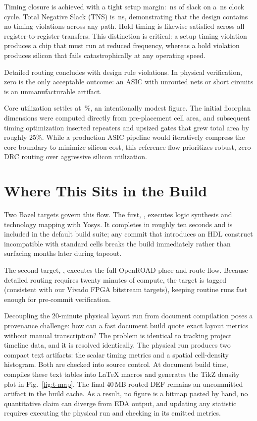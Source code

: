 \documentclass[journal,9pt]{IEEEtran}
\begin{document}
Timing closure is achieved with a tight setup margin: \asicslack\,ns of
slack on a \asicperiod\,ns clock cycle. Total Negative Slack (TNS) is
\asictns\,ns, demonstrating that the design contains no timing
violations across any path. Hold timing is likewise satisfied across all
register-to-register transfers. This distinction is critical: a setup
timing violation produces a chip that must run at reduced frequency,
whereas a hold violation produces silicon that fails catastrophically at
any operating speed.

Detailed routing concludes with \asicdrc{} design rule violations. In
physical verification, zero is the only acceptable outcome: an ASIC with
unrouted nets or short circuits is an unmanufacturable artifact.

Core utilization settles at \asicutil\,\%, an intentionally modest
figure. The initial floorplan dimensions were computed directly from
pre-placement cell area, and subsequent timing optimization inserted
repeaters and upsized gates that grew total area by roughly 25\%. While a
production ASIC pipeline would iteratively compress the core boundary to
minimize silicon cost, this reference flow prioritizes robust, zero-DRC
routing over aggressive silicon utilization.

\section{Where This Sits in the Build}
\label{sec:t-build}

Two Bazel targets govern this flow. The first,
, executes logic synthesis and
technology mapping with Yosys. It completes in roughly ten seconds and is
included in the default build suite; any commit that introduces an HDL
construct incompatible with standard cells breaks the build immediately
rather than surfacing months later during tapeout.

The second target, , executes the
full OpenROAD place-and-route flow. Because detailed routing requires
twenty minutes of compute, the target is tagged  (consistent
with our Vivado FPGA bitstream targets), keeping routine  runs fast enough for pre-commit verification.

Decoupling the 20-minute physical layout run from document compilation
poses a provenance challenge: how can a fast document build quote exact
layout metrics without manual transcription? The problem is identical to
tracking project timeline data, and it is resolved identically. The
physical run produces two compact text artifacts: the scalar timing
metrics and a spatial cell-density histogram. Both are checked into
source control. At document build time,  compiles
these text tables into LaTeX macros and generates the TikZ density plot
in Fig.~\ref{fig:t-map}. The final 40\,MB routed DEF remains an
uncommitted artifact in the build cache. As a result, no figure is a
bitmap pasted by hand, no quantitative claim can diverge from EDA
output, and updating any statistic requires executing the physical run
and checking in its emitted metrics.
\end{document}
